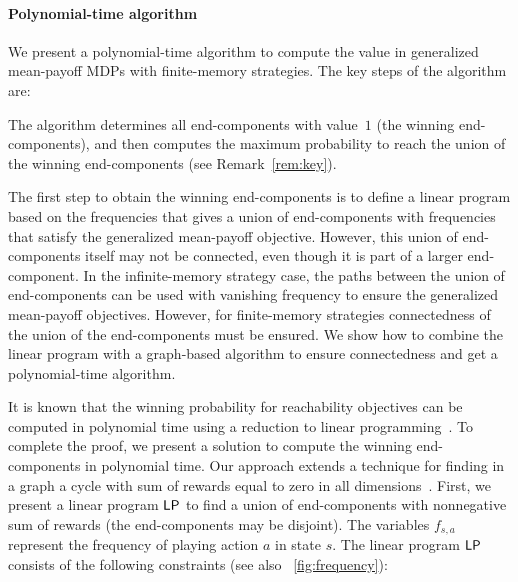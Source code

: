 \documentclass{article}
\newcommand{\LP}{{\sf LP}}
\begin{document}
\paragraph{Polynomial-time algorithm}
We present a polynomial-time algorithm to compute the value
in  generalized mean-payoff MDPs with finite-memory strategies.
The key steps of the algorithm are:
\begin{compactitem}
\item The algorithm determines all end-components with value~$1$ (the 
winning end-components), and then computes the maximum probability to reach 
the union of the winning end-components (see Remark~\ref{rem:key}). 

\item The first step to obtain the winning end-components is to define a 
linear program based on the frequencies that
gives a union of end-components with frequencies
that satisfy the generalized mean-payoff objective.
However, this union of end-components itself may not be connected,
even though it is part of a larger end-component.
In the infinite-memory strategy case, the paths between the union of
end-components can be used with vanishing frequency to ensure
the generalized mean-payoff objectives.
However, for finite-memory strategies connectedness of the union of the 
end-components must be ensured.
We show how to combine the linear program with a graph-based algorithm
to ensure connectedness and get a polynomial-time algorithm.

\end{compactitem}

\smallskip{}
It is known that the winning probability for reachability objectives can be computed in polynomial time using a reduction
to linear programming~\cite{FV97}. To complete the proof, we present a solution 
to compute the winning end-components in polynomial time.
Our approach extends a technique for finding in a graph a cycle with sum 
of rewards equal to zero in all dimensions~\cite{KS88}.
First, we present a linear program $\LP$ to find a union of end-components with nonnegative
sum of rewards (the end-components may be disjoint). 
The variables $f_{s,a}$ represent the frequency of playing action $a$ in state $s$. 
The linear program $\LP$ consists of the following constraints (see also \figurename~\ref{fig:frequency}):
\end{document}
